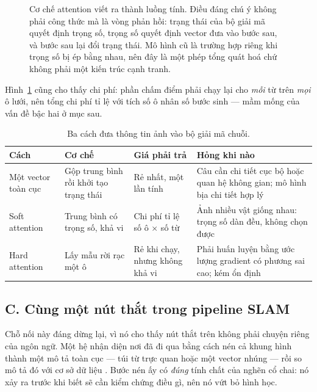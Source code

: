\documentclass[../../../deep_learning.tex]{subfiles}
\begin{document}
\begin{figure}[H]
{}
\caption{Cơ chế attention viết ra thành luồng tính. Điều đáng chú ý không phải công thức mà là vòng phản hồi: trạng thái của bộ giải mã quyết định trọng số, trọng số quyết định vector đưa vào bước sau, và bước sau lại đổi trạng thái. Mô hình cũ là trường hợp riêng khi trọng số bị ép bằng nhau, nên đây là một phép tổng quát hoá chứ không phải một kiến trúc cạnh tranh.}
\label{fig:attention-mechanism}
\end{figure}

Hình~\ref{fig:attention-mechanism} cũng cho thấy chi phí: phần chấm điểm phải chạy lại cho \emph{mỗi} từ trên \emph{mọi} ô lưới, nên tổng chi phí tỉ lệ với tích số ô nhân số bước sinh --- mầm mống của vấn đề bậc hai ở mục sau.

\begin{table}[H]\centering\small
\caption{Ba cách đưa thông tin ảnh vào bộ giải mã chuỗi.}
\label{tab:attention-variants}
\begin{tabularx}{\linewidth}{@{}L{2.3cm}YYL{3.6cm}@{}}
\toprule
\textbf{Cách} & \textbf{Cơ chế} & \textbf{Giá phải trả} & \textbf{Hỏng khi nào}\\
\midrule
Một vector toàn cục & Gộp trung bình rồi khởi tạo trạng thái & Rẻ nhất, một lần tính & Câu cần chi tiết cục bộ hoặc quan hệ không gian; mô hình bịa chi tiết hợp lý\\
Soft attention & Trung bình có trọng số, khả vi & Chi phí tỉ lệ số ô \(\times\) số từ & Ảnh nhiều vật giống nhau: trọng số dàn đều, không chọn được\\
Hard attention & Lấy mẫu rời rạc một ô & Rẻ khi chạy, nhưng không khả vi & Phải huấn luyện bằng ước lượng gradient có phương sai cao; kém ổn định\\
\bottomrule
\end{tabularx}
\end{table}


\subsection{C. Cùng một nút thắt trong pipeline SLAM}
Chỗ nối này đáng dừng lại, vì nó cho thấy nút thắt trên không phải chuyện riêng của ngôn ngữ. Một hệ  nhận diện nơi đã đi qua bằng cách nén cả khung hình thành một mô tả toàn cục --- túi từ trực quan hoặc một vector nhúng --- rồi so mô tả đó với cơ sở dữ liệu \cite{mur2017orbslam2, campos2021orbslam3}. Bước nén ấy có \emph{đúng} tính chất của nghẽn cổ chai: nó xảy ra trước khi biết sẽ cần kiểm chứng điều gì, nên nó vứt bỏ hình học.
\end{document}
